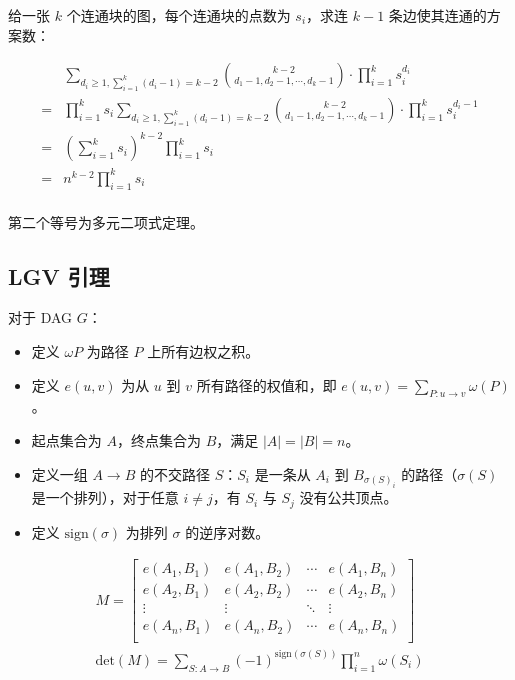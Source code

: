 给一张 $k$ 个连通块的图，每个连通块的点数为 $s_i$，求连 $k - 1$ 条边使其连通的方案数：

$$
\begin{aligned}
& \sum\limits_{d_i \ge 1, \sum_{i = 1}^k (d_i - 1) = k - 2} \binom{k - 2}{d_1 - 1, d_2 - 1, \cdots, d_k - 1} \cdot \prod\limits_{i = 1}^k s_i^{d_i} \\
=& \prod\limits_{i = 1}^k s_i \sum\limits_{d_i \ge 1, \sum_{i = 1}^k (d_i - 1) = k - 2} \binom{k - 2}{d_1 - 1, d_2 - 1, \cdots, d_k - 1} \cdot \prod\limits_{i = 1}^k s_i^{d_i - 1} \\
=& (\sum\limits_{i = 1}^k s_i)^{k - 2} \prod\limits_{i = 1}^k s_i \\
=& n^{k - 2} \prod\limits_{i = 1}^k s_i \\
\end{aligned}
$$

第二个等号为多元二项式定理。

\subsection{LGV 引理}

对于 DAG $G$：

\begin{itemize}
    \item 定义 $\omega{P}$ 为路径 $P$ 上所有边权之积。
    \item 定义 $e(u, v)$ 为从 $u$ 到 $v$ 所有路径的权值和，即 $e(u, v) = \sum_{P: u \to v} \omega(P)$。
    \item 起点集合为 $A$，终点集合为 $B$，满足 $|A| = |B| = n$。
    \item 定义一组 $A \to B$ 的不交路径 $S$：$S_i$ 是一条从 $A_i$ 到 $B_{\sigma(S)_i}$ 的路径（$\sigma(S)$ 是一个排列），对于任意 $i \ne j$，有 $S_i$ 与 $S_j$ 没有公共顶点。
    \item 定义 $\mathrm{sign}(\sigma)$ 为排列 $\sigma$ 的逆序对数。
\end{itemize}


$$
\begin{aligned}
M = \left[
\begin{matrix}
e(A_1, B_1) & e(A_1, B_2) & \cdots & e(A_1, B_n) \\
e(A_2, B_1) & e(A_2, B_2) & \cdots & e(A_2, B_n) \\
\vdots & \vdots & \ddots & \vdots \\
e(A_n, B_1) & e(A_n, B_2) & \cdots & e(A_n, B_n) \\
\end{matrix}
\right] \\
\mathrm{det}(M) = \sum\limits_{S: A \to B} (-1)^{\mathrm{sign}(\sigma(S))} \prod\limits_{i = 1}^n \omega(S_i)
\end{aligned}
$$

